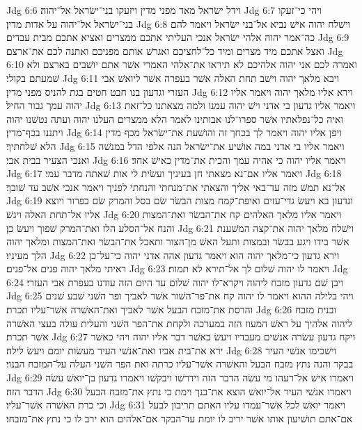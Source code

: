 Jdg 6:6  וידל ישׂראל מאד מפני מדין ויזעקו בני־ישׂראל אל־יהוה׃
Jdg 6:7  ויהי כי־זעקו בני־ישׂראל אל־יהוה על אדות מדין׃
Jdg 6:8  וישׁלח יהוה אישׁ נביא אל־בני ישׂראל ויאמר להם כה־אמר יהוה אלהי ישׂראל אנכי העליתי אתכם ממצרים ואציא אתכם מבית עבדים׃
Jdg 6:9  ואצל אתכם מיד מצרים ומיד כל־לחציכם ואגרשׁ אותם מפניכם ואתנה לכם את־ארצם׃
Jdg 6:10  ואמרה לכם אני יהוה אלהיכם לא תיראו את־אלהי האמרי אשׁר אתם יושׁבים בארצם ולא שׁמעתם בקולי׃
Jdg 6:11  ויבא מלאך יהוה וישׁב תחת האלה אשׁר בעפרה אשׁר ליואשׁ אבי העזרי וגדעון בנו חבט חטים בגת להניס מפני מדין׃
Jdg 6:12  וירא אליו מלאך יהוה ויאמר אליו יהוה עמך גבור החיל׃
Jdg 6:13  ויאמר אליו גדעון בי אדני וישׁ יהוה עמנו ולמה מצאתנו כל־זאת ואיה כל־נפלאתיו אשׁר ספרו־לנו אבותינו לאמר הלא ממצרים העלנו יהוה ועתה נטשׁנו יהוה ויתננו בכף־מדין׃
Jdg 6:14  ויפן אליו יהוה ויאמר לך בכחך זה והושׁעת את־ישׂראל מכף מדין הלא שׁלחתיך׃
Jdg 6:15  ויאמר אליו בי אדני במה אושׁיע את־ישׂראל הנה אלפי הדל במנשׁה ואנכי הצעיר בבית אבי׃
Jdg 6:16  ויאמר אליו יהוה כי אהיה עמך והכית את־מדין כאישׁ אחד׃
Jdg 6:17  ויאמר אליו אם־נא מצאתי חן בעיניך ועשׂית לי אות שׁאתה מדבר עמי׃
Jdg 6:18  אל־נא תמשׁ מזה עד־באי אליך והצאתי את־מנחתי והנחתי לפניך ויאמר אנכי אשׁב עד שׁובך׃
Jdg 6:19  וגדעון בא ויעשׂ גדי־עזים ואיפת־קמח מצות הבשׂר שׂם בסל והמרק שׂם בפרור ויוצא אליו אל־תחת האלה ויגשׁ׃
Jdg 6:20  ויאמר אליו מלאך האלהים קח את־הבשׂר ואת־המצות והנח אל־הסלע הלז ואת־המרק שׁפוך ויעשׂ כן׃
Jdg 6:21  וישׁלח מלאך יהוה את־קצה המשׁענת אשׁר בידו ויגע בבשׂר ובמצות ותעל האשׁ מן־הצור ותאכל את־הבשׂר ואת־המצות ומלאך יהוה הלך מעיניו׃
Jdg 6:22  וירא גדעון כי־מלאך יהוה הוא ויאמר גדעון אהה אדני יהוה כי־על־כן ראיתי מלאך יהוה פנים אל־פנים׃
Jdg 6:23  ויאמר לו יהוה שׁלום לך אל־תירא לא תמות׃
Jdg 6:24  ויבן שׁם גדעון מזבח ליהוה ויקרא־לו יהוה שׁלום עד היום הזה עודנו בעפרת אבי העזרי׃
Jdg 6:25  ויהי בלילה ההוא ויאמר לו יהוה קח את־פר־השׁור אשׁר לאביך ופר השׁני שׁבע שׁנים והרסת את־מזבח הבעל אשׁר לאביך ואת־האשׁרה אשׁר־עליו תכרת׃
Jdg 6:26  ובנית מזבח ליהוה אלהיך על ראשׁ המעוז הזה במערכה ולקחת את־הפר השׁני והעלית עולה בעצי האשׁרה אשׁר תכרת׃
Jdg 6:27  ויקח גדעון עשׂרה אנשׁים מעבדיו ויעשׂ כאשׁר דבר אליו יהוה ויהי כאשׁר ירא את־בית אביו ואת־אנשׁי העיר מעשׂות יומם ויעשׂ לילה׃
Jdg 6:28  וישׁכימו אנשׁי העיר בבקר והנה נתץ מזבח הבעל והאשׁרה אשׁר־עליו כרתה ואת הפר השׁני העלה על־המזבח הבנוי׃
Jdg 6:29  ויאמרו אישׁ אל־רעהו מי עשׂה הדבר הזה וידרשׁו ויבקשׁו ויאמרו גדעון בן־יואשׁ עשׂה הדבר הזה׃
Jdg 6:30  ויאמרו אנשׁי העיר אל־יואשׁ הוצא את־בנך וימת כי נתץ את־מזבח הבעל וכי כרת האשׁרה אשׁר־עליו׃
Jdg 6:31  ויאמר יואשׁ לכל אשׁר־עמדו עליו האתם תריבון לבעל אם־אתם תושׁיעון אותו אשׁר יריב לו יומת עד־הבקר אם־אלהים הוא ירב לו כי נתץ את־מזבחו׃
